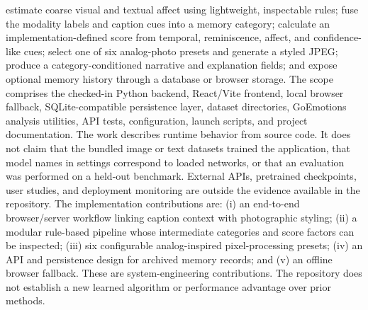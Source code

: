 \documentclass[conference]{IEEEtran}
\begin{document}
estimate coarse visual and textual affect using lightweight, inspectable rules;\markdownRendererOlItemEnd 
{}fuse the modality labels and caption cues into a memory category;\markdownRendererOlItemEnd 
{}calculate an implementation-defined score from temporal, reminiscence, affect, and confidence-like cues;\markdownRendererOlItemEnd 
{}select one of six analog-photo presets and generate a styled JPEG;\markdownRendererOlItemEnd 
{}produce a category-conditioned narrative and explanation fields; and\markdownRendererOlItemEnd 
{}expose optional memory history through a database or browser storage.\markdownRendererOlItemEnd 
\markdownRendererOlEndTight \markdownRendererInterblockSeparator
{}
\markdownRendererSectionEnd \markdownRendererSectionBegin
{}\markdownRendererInterblockSeparator
{}The scope comprises the checked-in Python backend, React/Vite frontend, local browser fallback, SQLite-compatible persistence layer, dataset directories, GoEmotions analysis utilities, API tests, configuration, launch scripts, and project documentation. The work describes runtime behavior from source code. It does not claim that the bundled image or text datasets trained the application, that model names in settings correspond to loaded networks, or that an evaluation was performed on a held-out benchmark. External APIs, pretrained checkpoints, user studies, and deployment monitoring are outside the evidence available in the repository.\markdownRendererInterblockSeparator
{}
\markdownRendererSectionEnd \markdownRendererSectionBegin
{}\markdownRendererInterblockSeparator
{}The implementation contributions are: (i) an end-to-end browser/server workflow linking caption context with photographic styling; (ii) a modular rule-based pipeline whose intermediate categories and score factors can be inspected; (iii) six configurable analog-inspired pixel-processing presets; (iv) an API and persistence design for archived memory records; and (v) an offline browser fallback. These are system-engineering contributions. The repository does not establish a new learned algorithm or performance advantage over prior methods.\markdownRendererInterblockSeparator
{}
\markdownRendererSectionEnd 
\markdownRendererSectionEnd \markdownRendererSectionBegin
{}\markdownRendererInterblockSeparator
\end{document}

